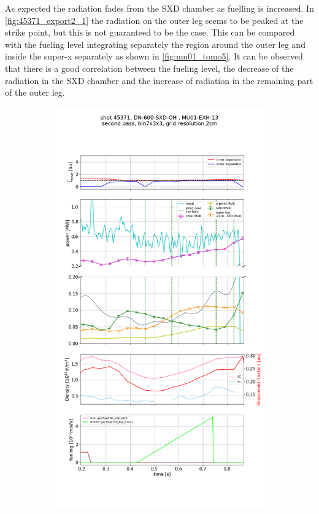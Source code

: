 As expected the radiation fades from the SXD chamber as fuelling is increased. In \autoref{fig:45371_export2_1} the radiation on the outer leg seems to be peaked at the strike point, but this is not guaranteed to be the case. This can be compared with the fueling level integrating separately the region around the outer leg and inside the super-x separately as shown in \autoref{fig:mu01_tomo5}. It can be observed that there is a good correlation between the fueling level, the decrease of the radiation in the SXD chamber and the increase of radiation in the remaining part of the outer leg.

\begin{figure}
     \centering
     \begin{subfigure}{0.8\linewidth}
         \centering
         \includegraphics[trim={0 555 0 310},clip,width=\textwidth]{Chapters/chapter2/figs/IRVB-MASTU_shot-45371_pass1_bin7x3x3_gridres2cm_all_variables_absolute_small4.png}

\end{subfigure}
\end{figure}

